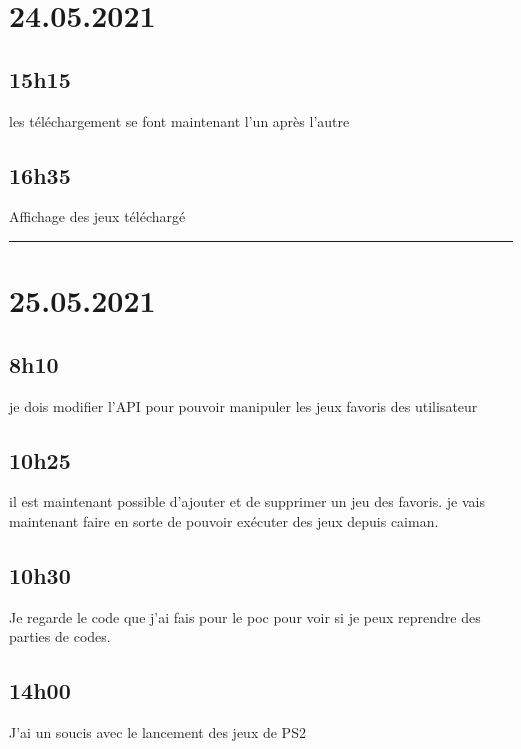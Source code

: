\documentclass[a4paper,12pt,french]{sphinxmanual}
\begin{document}
\section{24.05.2021}
\label{\detokenize{logbook:id146}}

\subsection{15h15}
\label{\detokenize{logbook:id147}}
\sphinxAtStartPar
les téléchargement se font maintenant l’un après l’autre


\subsection{16h35}
\label{\detokenize{logbook:id148}}
\sphinxAtStartPar
Affichage des jeux téléchargé


\bigskip\hrule\bigskip



\section{25.05.2021}
\label{\detokenize{logbook:id149}}

\subsection{8h10}
\label{\detokenize{logbook:id150}}
\sphinxAtStartPar
je dois modifier l’API pour pouvoir manipuler les jeux favoris des utilisateur


\subsection{10h25}
\label{\detokenize{logbook:h25}}
\sphinxAtStartPar
il est maintenant possible d’ajouter et de supprimer un jeu des favoris.
je vais maintenant faire en sorte de pouvoir exécuter des jeux depuis caiman.


\subsection{10h30}
\label{\detokenize{logbook:id151}}
\sphinxAtStartPar
Je regarde le code que j’ai fais pour le poc pour voir si je peux reprendre des parties de codes.


\subsection{14h00}
\label{\detokenize{logbook:id152}}
\sphinxAtStartPar
J’ai un soucis avec le lancement des jeux de PS2
\end{document}
